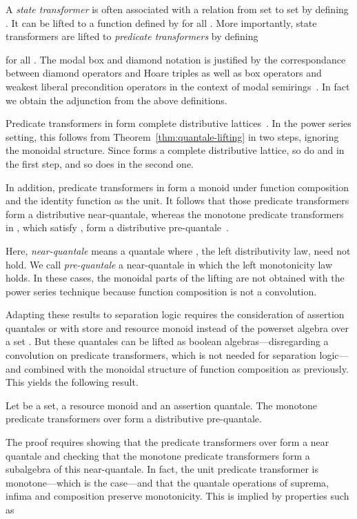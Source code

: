 \documentclass[twoside,runningheads,envcountsame,envcountsect,oribibl,orivec]{llncs}
\begin{document}
A \emph{state transformer}  is often associated with a
relation  from set  to set  by defining . It can be lifted to a function  defined by  for all . More importantly, state transformers
are lifted to \emph{predicate transformers}  by
defining

for all . The modal box and diamond notation is
justified by the correspondance between diamond operators and Hoare
triples as well as box operators and weakest liberal precondition
operators in the context of modal semirings~\cite{MoellerStruth}. In
fact we obtain the adjunction  from the above definitions.

Predicate transformers in  form complete distributive
lattices~\cite{BvW99-book}. In the power series setting, this follows
from Theorem~\ref{thm:quantale-lifting} in two steps, ignoring the
monoidal structure. Since  forms a complete distributive
lattice, so do  and  in
the first step, and so does  in the second one.

In addition, predicate transformers in  form a monoid
under function composition and the identity function as the unit.  It
follows that those predicate transformers form a distributive
near-quantale, whereas the monotone predicate transformers in
, which satisfy , form a
distributive pre-quantale~\cite{BvW99-book}.

Here, \emph{near-quantale} means a quantale where , the left distributivity law,
need not hold. We call \emph{pre-quantale} a near-quantale in which
the left monotonicity law 
holds. In these cases, the monoidal parts of the lifting are not
obtained with the power series technique because function composition
is not a convolution.

Adapting these results to separation logic requires the consideration
of assertion quantales  or  with
store  and resource monoid  instead of the powerset algebra over
a set . But these quantales can be lifted as boolean
algebras---disregarding a convolution on predicate transformers, which
is not needed for separation logic---and combined with the monoidal
structure of function composition as previously. This yields the
following result.
\begin{theorem}\label{thm:sep-pt-quantales}
  Let  be a set,  a resource monoid and 
  an assertion quantale. The monotone predicate transformers over
   form a distributive pre-quantale.
\end{theorem}
The proof requires showing that the predicate transformers over
 form a near quantale and checking that the
monotone predicate transformers form a subalgebra of this
near-quantale. In fact, the unit predicate transformer is
monotone---which is the case---and that the quantale operations of
suprema, infima and composition preserve monotonicity. This is implied
by properties such as
\end{document}

